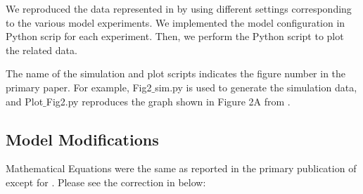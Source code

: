 \documentclass[fleqn,10pt]{physiome}
\begin{document}
We reproduced the data represented in \citet[Figures 2A, 3A, 4A, 6(A and B) \& 8A ]{imtiaz2002theoretical} by using different settings corresponding to the various model experiments. We implemented the model configuration in Python scrip for each experiment. Then, we perform the Python script to plot the related data.

The name of the simulation and plot scripts indicates the figure number in the primary paper. For example,
Fig2$\_$sim.py is used to generate the simulation data, and Plot$\_$Fig2.py reproduces the graph shown in Figure 2A from \citep{imtiaz2002theoretical}.

\subsection{Model Modifications }
\label{Parameter_Values}

Mathematical Equations were the same as reported in the primary publication of \citet{imtiaz2002theoretical} except for \cite[Equations 3, 7, and 9]{imtiaz2002theoretical}. Please see the correction in below:
\end{document}

